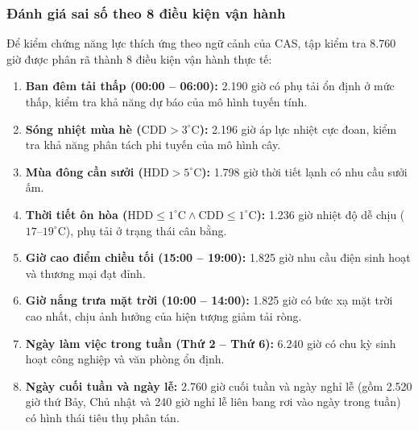 \subsubsection{Đánh giá sai số theo 8 điều kiện vận hành}
Để kiểm chứng năng lực thích ứng theo ngữ cảnh của CAS, tập kiểm tra 8.760 giờ được phân rã thành 8 điều kiện vận hành thực tế:
\begin{enumerate}
    \item \textbf{Ban đêm tải thấp (00:00 -- 06:00):} 2.190 giờ có phụ tải ổn định ở mức thấp, kiểm tra khả năng dự báo của mô hình tuyến tính.
    \item \textbf{Sóng nhiệt mùa hè ($\text{CDD} > 3^\circ\text{C}$):} 2.196 giờ áp lực nhiệt cực đoan, kiểm tra khả năng phân tách phi tuyến của mô hình cây.
    \item \textbf{Mùa đông cần sưởi ($\text{HDD} > 5^\circ\text{C}$):} 1.798 giờ thời tiết lạnh có nhu cầu sưởi ấm.
    \item \textbf{Thời tiết ôn hòa ($\text{HDD} \le 1^\circ\text{C} \wedge \text{CDD} \le 1^\circ\text{C}$):} 1.236 giờ nhiệt độ dễ chịu ($17\text{--}19^\circ\text{C}$), phụ tải ở trạng thái cân bằng.
    \item \textbf{Giờ cao điểm chiều tối (15:00 -- 19:00):} 1.825 giờ nhu cầu điện sinh hoạt và thương mại đạt đỉnh.
    \item \textbf{Giờ nắng trưa mặt trời (10:00 -- 14:00):} 1.825 giờ có bức xạ mặt trời cao nhất, chịu ảnh hưởng của hiện tượng giảm tải ròng.
    \item \textbf{Ngày làm việc trong tuần (Thứ 2 -- Thứ 6):} 6.240 giờ có chu kỳ sinh hoạt công nghiệp và văn phòng ổn định.
    \item \textbf{Ngày cuối tuần và ngày lễ:} 2.760 giờ cuối tuần và ngày nghỉ lễ (gồm 2.520 giờ thứ Bảy, Chủ nhật và 240 giờ nghỉ lễ liên bang rơi vào ngày trong tuần) có hình thái tiêu thụ phân tán.
\end{enumerate}

